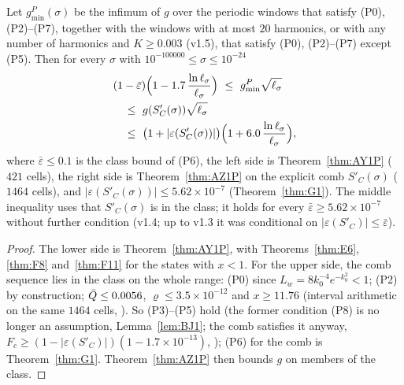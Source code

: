 \begin{theorem} 
\label{thm:BF1}
Let $g_{\min}^P(\sigma)$ be the infimum of $g$ over the periodic windows that satisfy (P0), (P2)--(P7), together with the windows with at most $20$
harmonics, or with any number of harmonics and $K\ge0.003$ (v1.5), that satisfy (P0), (P2)--(P7) except (P5). Then for every $\sigma$ with $10^{-100000}\le\sigma\le10^{-24}$
\begin{equation}
\begin{aligned}&(1-\bar\varepsilon)\Big(1-1.7\,\frac{\ln\ls}{\ls}\Big)\ \le\ g_{\min}^P\sqrt{\ls}\\ &\quad\le\ g(S'_C(\sigma))\sqrt{\ls}\\ &\quad\le\ \big(1+|\varepsilon(S'_C(\sigma))|\big)\Big(1+6.0\,\frac{\ln\ls}{\ls}\Big),\end{aligned}
\end{equation}
where $\bar\varepsilon\le0.1$ is the class bound of (P6), the left side is Theorem~\ref{thm:AY1P} ($421$ cells), the right side is Theorem~\ref{thm:AZ1P} on
the explicit comb $S'_C(\sigma)$ ($1464$ cells), and $|\varepsilon(S'_C(\sigma))|\le5.62\times10^{-7}$ (Theorem~\ref{thm:G1}). The middle inequality uses that $S'_C(\sigma)$ is in
the class; it holds for every $\bar\varepsilon\ge5.62\times10^{-7}$ without further condition (v1.4; up to v1.3 it was conditional on $|\varepsilon(S'_C)|\le\bar\varepsilon$).
\end{theorem}
\begin{proof}
The lower side is Theorem~\ref{thm:AY1P}, with Theorems~\ref{thm:E6}, \ref{thm:F8} and~\ref{thm:F11} for the states with $x<1$. For the upper side, the comb sequence lies in the class on the whole range: (P0) since $L_w=8k_0^{-4}e^{-k_0^2}<1$; (P2) by construction;
$\bar Q\le0.0056$, $\varrho\le3.5\times10^{-12}$ and $x\ge11.76$ (interval arithmetic on the same $1464$ cells, ). So (P3)--(P5) hold
(the former condition (P8) is no longer an assumption, Lemma~\ref{lem:BJ1}; the comb satisfies it anyway, $F_c\ge(1-|\varepsilon(S'_C)|)(1-1.7\times10^{-13})$, );
(P6) for the comb is Theorem~\ref{thm:G1}. Theorem~\ref{thm:AZ1P} then bounds $g$ on members of the class.
\end{proof}

